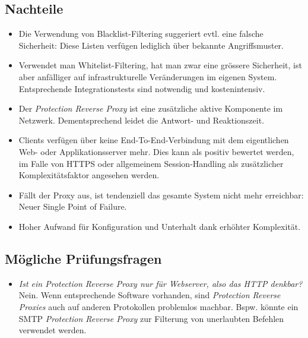 \subsection*{Nachteile}
\begin{itemize}
	\item Die Verwendung von Blacklist-Filtering suggeriert evtl. eine falsche Sicherheit: Diese Listen verfügen lediglich über bekannte Angriffsmuster.
	\item Verwendet man Whitelist-Filtering, hat man zwar eine grössere Sicherheit, ist aber anfälliger auf infrastrukturelle Veränderungen im eigenen System. Entsprechende Integrationstests sind notwendig und kostenintensiv.
	\item Der \emph{Protection Reverse Proxy} ist eine zusätzliche aktive Komponente im Netzwerk. Dementsprechend leidet die Antwort- und Reaktionszeit.
	\item Clients verfügen über keine End-To-End-Verbindung mit dem eigentlichen Web- oder Applikationsserver mehr. Dies kann als positiv bewertet werden, im Falle von HTTPS oder allgemeinem Session-Handling als zusätzlicher Komplexitätsfaktor angesehen werden.
	\item Fällt der Proxy aus, ist tendenziell das gesamte System nicht mehr erreichbar: Neuer Single Point of Failure.
	\item Hoher Aufwand für Konfiguration und Unterhalt dank erhöhter Komplexität.
\end{itemize}

\subsection*{Mögliche Prüfungsfragen}
\begin{itemize}
	\item \emph{Ist ein Protection Reverse Proxy nur für Webserver, also das HTTP denkbar?}\\
	Nein. Wenn entsprechende Software vorhanden, sind \emph{Protection Reverse Proxies} auch auf anderen Protokollen problemlos machbar. Bspw. könnte ein SMTP \emph{Protection Reverse Proxy} zur Filterung von unerlaubten Befehlen verwendet werden.
\end{itemize}